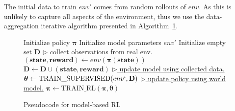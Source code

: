 The initial data to train $env'$ comes from random rollouts of $env$. As this is unlikely to capture all aspects of the environment, thus we use the data-aggregation iterative algorithm presented in Algorithm~\ref{alg:basic_loop}.
\begin{figure}
\removelatexerror
\begin{algorithm}[H]
\caption{Pseudocode for model-based RL}\label{dpll}
\begin{algorithmic}
\STATE Initialize policy $\boldsymbol\pi$
\STATE Initialize model parameters $env'$
\STATE Initialize empty set $\mathbf{D}$
\STATE \underline{$\triangleright$ collect observations from real env.}
\STATE $(\mathbf{state},\mathbf{reward}) \gets env(\boldsymbol\pi(\mathbf{state}))$
\STATE $\mathbf{D} \gets \mathbf{D} \cup (\mathbf{state},\mathbf{reward})$
\ENDWHILE
\STATE \underline{$\triangleright$ update model using collected data.}
\STATE $\boldsymbol\theta \gets \text{TRAIN\_SUPERVISED}(env`, \mathbf{D})$
\STATE \underline{$\triangleright$ update policy using world model.}
\STATE $\boldsymbol\pi \gets \text{TRAIN\_RL}(\boldsymbol\pi, \boldsymbol\theta)$
\ENDWHILE
\end{algorithmic}
\label{basic_loop}
\label{alg:basic_loop}
\end{algorithm}
\end{figure}